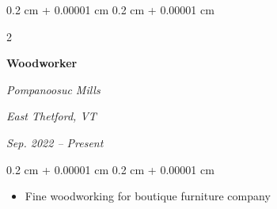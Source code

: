 \documentclass[10pt, letterpaper]{article}
\newenvironment{highlights}{
    \begin{itemize}[
        topsep=0.10 cm,
        parsep=0.10 cm,
        partopsep=0pt,
        itemsep=0pt,
        leftmargin=0.4 cm + 10pt
    ]
}{
    \end{itemize}
} %
\newenvironment{onecolentry}{
    \begin{adjustwidth}{
        0.2 cm + 0.00001 cm
    }{
        0.2 cm + 0.00001 cm
    }
}{
    \end{adjustwidth}
} %
\newenvironment{twocolentry}[2][]{
    \onecolentry
    \def\secondColumn{#2}
    \setcolumnwidth{\fill, 4.5 cm}
    \begin{paracol}{2}
}{
    \switchcolumn \raggedleft \secondColumn
    \end{paracol}
    \endonecolentry
} %
\begin{document}
\vspace{0.2 cm}

\begin{twocolentry}{
		\textit{East Thetford, VT}

		\textit{Sep. 2022 – Present}}
	\textbf{Woodworker}

	\textit{Pompanoosuc Mills}
\end{twocolentry}

\vspace{0.10 cm}
\begin{onecolentry}
	\begin{highlights}
		\item Fine woodworking for boutique furniture company  %
	\end{highlights}
\end{onecolentry}


%
%
%
%


%
%
%
%
%
\end{document}
